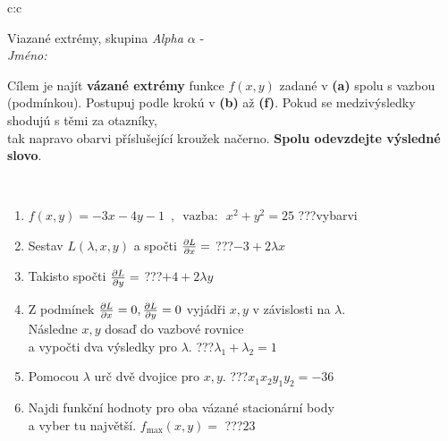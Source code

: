 \documentclass[10pt]{report}
\begin{document}
\thispagestyle{empty}
\begin{tabular}{c:c}
\begin{minipage}[c][104.5mm][t]{0.5\linewidth}
\begin{center}
\vspace{7mm}
{\huge Viazané extrémy, skupina \textit{Alpha $\alpha$} -}\\[5mm]
\textit{Jméno:}\phantom{xxxxxxxxxxxxxxxxxxxxxxxxxxxxxxxxxxxxxxxxxxxxxxxxxxxxxxxxxxxxxxxxx}\\[5mm]
\begin{minipage}{0.95\linewidth}
\begin{center}
Cílem je najít \textbf{vázané extrémy} funkce $f(x,y)$ zadané v \textbf{(a)} spolu s vazbou (podmínkou). Postupuj podle krokú v \textbf{(b)} až \textbf{(f)}. Pokud se medzivýsledky shodujú s těmi za otazníky,\\tak napravo obarvi příslušející kroužek načerno. \textbf{Spolu odevzdejte výsledné slovo}.
\end{center}
\end{minipage}
\\[1mm]
\begin{minipage}{0.79\linewidth}
\begin{center}
\begin{varwidth}{\linewidth}
\begin{enumerate}
\normalsize
\item $f(x,y)=-3x-4y-1 \enspace , \enspace \mathrm{vazba:} \enspace x^2+y^2=25$\quad \dotfill\; ???\;\dotfill \quad vybarvi
\item Sestav $L(\lambda,x,y)$ a spočti $\pdv{L}{x}=$\quad \dotfill\; ???\;\dotfill \quad $-3+2\lambda x$
\item Takisto spočti $\pdv{L}{y}=$\quad \dotfill\; ???\;\dotfill \quad $+4+2\lambda y$
\item Z podmínek $\pdv{L}{x}=0 , \pdv{L}{y}=0$ vyjádři $x,y$ v závislosti na $\lambda$.\\ \phantom{xxxxxx}Následne $x,y$ dosaď do vazbové rovnice\\ \phantom{xxxxxx}a vypočti dva výsledky pro $\lambda$.\quad \dotfill\; ???\;\dotfill \quad $\lambda_1+\lambda_2=1$
\item Pomocou $\lambda$ urč dvě dvojice pro $x,y$.\quad \dotfill\; ???\;\dotfill \quad $x_1 x_2 y_1 y_2=-36$
\item Najdi funkční hodnoty pro oba vázané stacionární body\\ \phantom{xxxxxx}a vyber tu najvětší. $f_{\text{max}}(x,y)=$\quad \dotfill\; ???\;\dotfill \quad $23$

\end{enumerate}
\end{varwidth}
\end{center}
\end{minipage}
\end{center}
\end{minipage}
\end{tabular}
\end{document}
